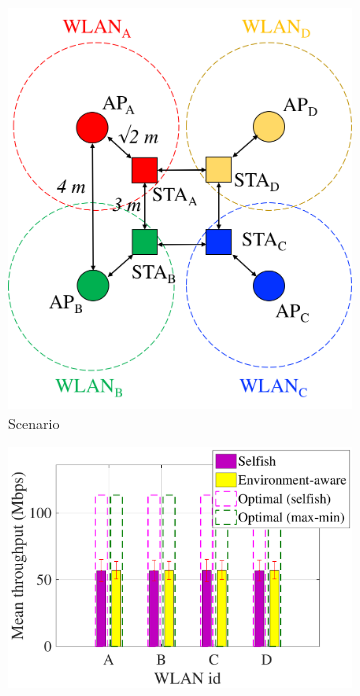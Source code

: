 \documentclass[preprint,12pt]{elsarticle}
\begin{document}
\begin{figure}[h!]
	\centering
	\begin{subfigure}[b]{0.3\textwidth}
		\includegraphics[width=\textwidth]{s6_new}
		\caption{Scenario}
		\label{fig:adversarial_issues_scenario}
	\end{subfigure}
	\begin{subfigure}[b]{0.4\textwidth}
		\includegraphics[width=\textwidth]{selfish_vs_informed_mean_tpt}

\end{subfigure}
\end{figure}
\end{document}
